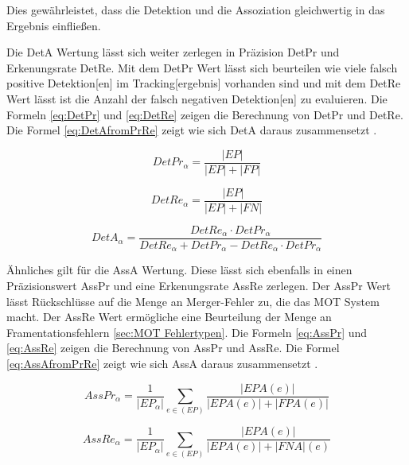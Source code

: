 Dies gewährleistet, dass die \gls{Detektion} und die \gls{Assoziation} gleichwertig in das Ergebnis einfließen. \par

Die \gls{DetA} Wertung lässt sich weiter zerlegen in Präzision \gls{DetPr} und Erkenungsrate \gls{DetRe}. Mit dem \gls{DetPr} Wert lässt sich beurteilen wie viele falsch positive \gls{Detektion}[en] im \gls{Tracking}[ergebnis] vorhanden sind und mit dem \gls{DetRe} Wert lässt ist die Anzahl der falsch negativen \gls{Detektion}[en] zu evaluieren. Die Formeln \ref{eq:DetPr} und \ref{eq:DetRe} zeigen die Berechnung von \gls{DetPr} und \gls{DetRe}. Die Formel \ref{eq:DetAfromPrRe} zeigt wie sich \gls{DetA} daraus zusammensetzt \cite{HOTA}.

\begin{equation}
    \label{eq:DetPr}
    DetPr_{\alpha} = \frac{|EP|}{|EP| + |FP|}
\end{equation}

\begin{equation}
    \label{eq:DetRe}
    DetRe_{\alpha} = \frac{|EP|}{|EP| + |FN|}
\end{equation}

\begin{equation}
    \label{eq:DetAfromPrRe}
    DetA_{\alpha} = \frac{DetRe_{\alpha} \cdot DetPr_{\alpha} }{DetRe_{\alpha} + DetPr_{\alpha} - DetRe_{\alpha} \cdot DetPr_{\alpha}}
\end{equation}

Ähnliches gilt für die \gls{AssA} Wertung. Diese lässt sich ebenfalls in einen  Präzisionswert \gls{AssPr} und eine Erkenungsrate \gls{AssRe} zerlegen. Der \gls{AssPr} Wert lässt Rückschlüsse auf die Menge an Merger-Fehler zu, die das \gls{MOT} System macht. Der \gls{AssRe} Wert ermögliche eine Beurteilung der Menge an Framentationsfehlern \ref{sec:MOT Fehlertypen}. Die Formeln \ref{eq:AssPr} und \ref{eq:AssRe} zeigen die Berechnung von \gls{AssPr} und \gls{AssRe}. Die Formel \ref{eq:AssAfromPrRe} zeigt wie sich \gls{AssA} daraus zusammensetzt \cite{HOTA}. 

\begin{equation}
    \label{eq:AssPr}
    AssPr_{\alpha} =  \frac{1}{|EP_{\alpha}|} \sum_{e \in (EP)} \frac{|EPA(e)|}{|EPA(e)| + |FPA(e)|}
\end{equation}

\begin{equation}
    \label{eq:AssRe}
    AssRe_{\alpha} = \frac{1}{|EP_{\alpha}|} \sum_{e \in (EP)} \frac{|EPA(e)|}{|EPA(e)| + |FNA|(e)}
\end{equation}


